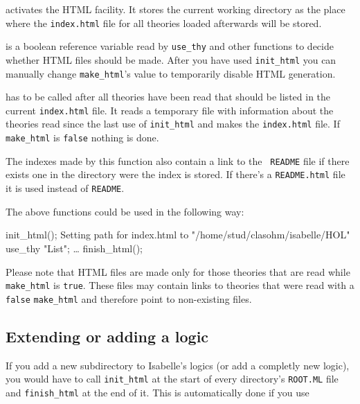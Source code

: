 \begin{ttdescription}
\item[\ttindexbold{init_html}]
activates the HTML facility. It stores the current working directory
as the place where the {\tt index.html} file for all theories loaded
afterwards will be stored.

\item[\ttindexbold{make_html}]
is a boolean reference variable read by {\tt use_thy} and other
functions to decide whether HTML files should be made. After you have
used {\tt init_html} you can manually change {\tt make_html}'s value
to temporarily disable HTML generation.

\item[\ttindexbold{finish_html}]
has to be called after all theories have been read that should be
listed in the current {\tt index.html} file. It reads a temporary
file with information about the theories read since the last use of
{\tt init_html} and makes the {\tt index.html} file. If {\tt
make_html} is {\tt false} nothing is done.

The indexes made by this function also contain a link to the {\tt
README} file if there exists one in the directory were the index is
stored. If there's a {\tt README.html} file it is used instead of
{\tt README}.

\end{ttdescription}

The above functions could be used in the following way:

\begin{ttbox}
init_html();
{\out Setting path for index.html to "/home/stud/clasohm/isabelle/HOL"}
use_thy "List";
\dots
finish_html();
\end{ttbox}

Please note that HTML files are made only for those theories that are
read while {\tt make_html} is {\tt true}. These files may contain
links to theories that were read with a {\tt false} {\tt make_html}
and therefore point to non-existing files.


\subsection*{Extending or adding a logic}

If you add a new subdirectory to Isabelle's logics (or add a completly
new logic), you would have to call {\tt init_html} at the start of every
directory's {\tt ROOT.ML} file and {\tt finish_html} at the end of
it. This is automatically done if you use

